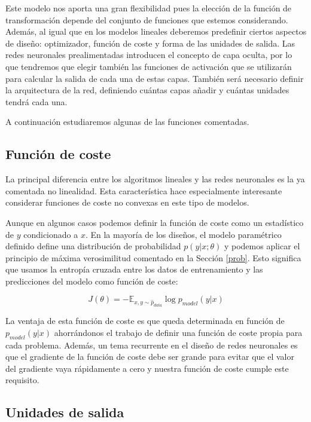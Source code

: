 	Este modelo nos aporta una gran flexibilidad pues la elección de la función de transformación depende del conjunto de funciones que estemos considerando. Además, al igual que en los modelos lineales deberemos predefinir ciertos aspectos de diseño: optimizador, función de coste y forma de las unidades de salida. Las redes neuronales prealimentadas introducen el concepto de capa oculta, por lo que tendremos que elegir también las funciones de activación que se utilizarán para calcular la salida de cada una de estas capas. También será necesario definir la arquitectura de la red, definiendo cuántas capas añadir y cuántas unidades tendrá cada una.  
	
	A continuación estudiaremos algunas de las funciones comentadas.
	
	\subsection{Función de coste}
	
	La principal diferencia entre los algoritmos lineales y las redes neuronales es la ya comentada no linealidad. Esta característica hace especialmente interesante considerar funciones de coste no convexas en este tipo de modelos. 
	
	Aunque en algunos casos podemos definir la función de coste como un estadístico de $y$ condicionado a $x$. En la mayoría de los diseños, el modelo paramétrico definido define una distribución de probabilidad $ p(y | x ; \theta)$ y podemos aplicar el principio de máxima verosimilitud comentado en la Sección \ref{prob}. Esto significa que usamos la entropía cruzada entre los datos de entrenamiento y las predicciones del modelo como función de coste:
	
	$$
		J(\theta) = - \mathbb{E}_{x,y \sim \hat{p}_{data}} \log p_{model}(y | x)
	$$
	
	La ventaja de esta función de coste es que queda determinada en función de $p_{model}(y|x)$ ahorrándonos el trabajo de definir una función de coste propia para cada problema. Además, un tema recurrente en el diseño de redes neuronales es que el gradiente de la función de coste debe ser grande para evitar que el valor del gradiente vaya rápidamente a cero y nuestra función de coste cumple este requisito.
	
	
	\subsection{Unidades de salida}
	

